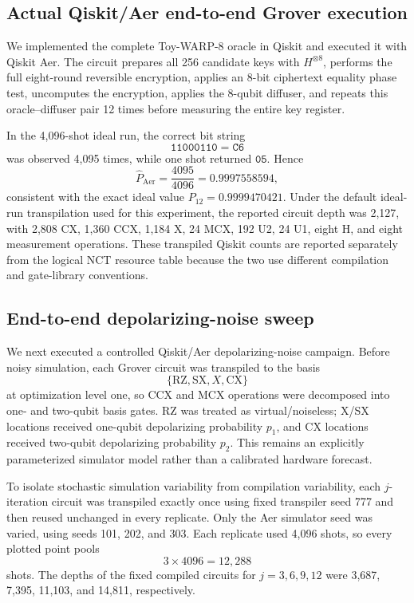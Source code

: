 \documentclass[pdflatex,sn-nature]{sn-jnl}
\theoremstyle{thmstyleone}
\theoremstyle{thmstyletwo}
\begin{document}
\subsection{Actual Qiskit/Aer end-to-end Grover execution}
\label{subsec:toywarp_qiskit}
We implemented the complete Toy-WARP-8 oracle in Qiskit and executed it with Qiskit Aer.  The circuit prepares all 256 candidate keys with $H^{\otimes 8}$, performs the full eight-round reversible encryption, applies an 8-bit ciphertext equality phase test, uncomputes the encryption, applies the 8-qubit diffuser, and repeats this oracle--diffuser pair 12 times before measuring the entire key register.

In the 4,096-shot ideal run, the correct bit string
\begin{equation}
    \mathtt{11000110}=\mathtt{C6}
\end{equation}
was observed 4,095 times, while one shot returned $\mathtt{05}$.  Hence
\begin{equation}
    \widehat P_{\mathrm{Aer}}=\frac{4095}{4096}=0.9997558594,
\end{equation}
consistent with the exact ideal value $P_{12}=0.9999470421$.  Under the default ideal-run transpilation used for this experiment, the reported circuit depth was 2,127, with 2,808 CX, 1,360 CCX, 1,184 X, 24 MCX, 192 U2, 24 U1, eight H, and eight measurement operations.  These transpiled Qiskit counts are reported separately from the logical NCT resource table because the two use different compilation and gate-library conventions.

\subsection{End-to-end depolarizing-noise sweep}
\label{subsec:toywarp_noise}
We next executed a controlled Qiskit/Aer depolarizing-noise campaign. Before noisy simulation, each Grover circuit was transpiled to the basis
\[
    \{\mathrm{RZ},\mathrm{SX},X,\mathrm{CX}\}
\]
at optimization level one, so CCX and MCX operations were decomposed into one- and two-qubit basis gates. RZ was treated as virtual/noiseless; X/SX locations received one-qubit depolarizing probability $p_1$, and CX locations received two-qubit depolarizing probability $p_2$. This remains an explicitly parameterized simulator model rather than a calibrated hardware forecast.

To isolate stochastic simulation variability from compilation variability, each $j$-iteration circuit was transpiled exactly once using fixed transpiler seed 777 and then reused unchanged in every replicate. Only the Aer simulator seed was varied, using seeds 101, 202, and 303. Each replicate used 4,096 shots, so every plotted point pools
\[
    3\times4096=12{,}288
\]
shots. The depths of the fixed compiled circuits for $j=3,6,9,12$ were 3,687, 7,395, 11,103, and 14,811, respectively.
\end{document}
